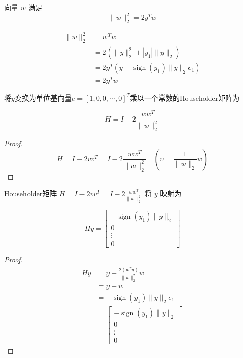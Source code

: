 \begin{theorem}
    向量 $ w $ 满足 $$ \|w\|_{2}^{2}=2 y^{T} w $$
\end{theorem}

$$
\begin{aligned}
    \|w\|_{2}^{2}&=w^{T} w\\
    &=2\left(\|y\|_{2}^{2}+\left|y_{1}\right|\|y\|_{2}\right)\\
    &=2 y^{T}\left(y+\operatorname{sign}\left(y_{1}\right)\|y\|_{2} e_{1}\right)\\
    &=2 y^{T} w 
\end{aligned}
$$

\begin{definition}
将$y$变换为单位基向量$e=[1,0,0,\cdots,0]^T$乘以一个常数的Householder矩阵为

    $$ H=I-2 \frac{w w^{T}}{\|w\|_{2}^{2}} $$
\end{definition}

\begin{proof}
    $$ H=I-2 v v^{T}=I-2 \frac{w w^{T}}{\|w\|_{2}^{2}} \quad(v=\frac{1}{\|w\|_{2}} w) $$
\end{proof}

\begin{theorem}
    Householder矩阵 $ H=I-2 v v^{T}=I-2 \frac{w w^{T}}{\|w\|_{2}^{2}} $ 将 $ y $ 映射为

   $$ H y = \left[\begin{array}{c}-\operatorname{sign}\left(y_{1}\right)\|y\|_{2} \\ 0 \\ \vdots \\ 0\end{array}\right] $$
\end{theorem}


\begin{proof}
    $$ 
\begin{aligned}
    H y&=y-\frac{2\left(w^{T} y\right)}{\|w\|_{2}^{2}} w\\
    &=y-w\\
    &=-\operatorname{sign}\left(y_{1}\right)\|y\|_{2} e_{1}\\
    &=\left[\begin{array}{c}-\operatorname{sign}\left(y_{1}\right)\|y\|_{2} \\ 0 \\ \vdots \\ 0\end{array}\right]
\end{aligned}
 $$
\end{proof}

